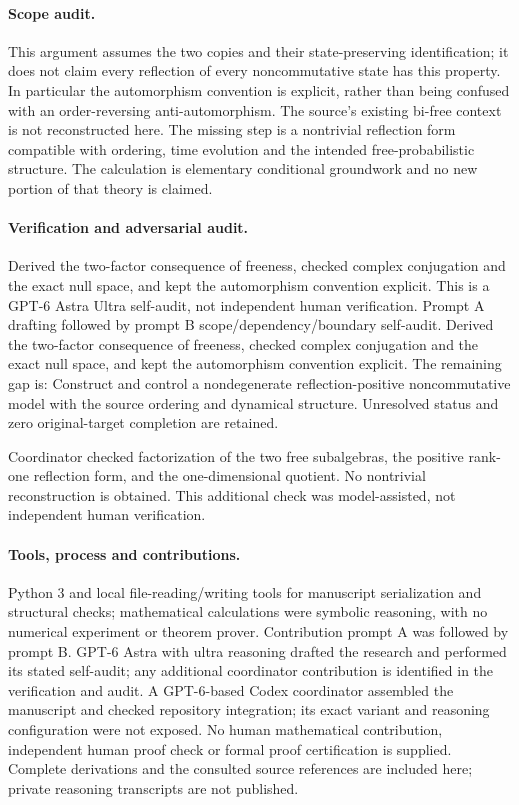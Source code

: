 \documentclass[11pt]{article}
\begin{document}
\paragraph{Scope audit.} This argument assumes the two copies and their state-preserving identification; it does not claim every reflection of every noncommutative state has this property. In particular the automorphism convention is explicit, rather than being confused with an order-reversing anti-automorphism. The source's existing bi-free context is not reconstructed here. The missing step is a nontrivial reflection form compatible with ordering, time evolution and the intended free-probabilistic structure. The calculation is elementary conditional groundwork and no new portion of that theory is claimed.

\paragraph{Verification and adversarial audit.}
Derived the two-factor consequence of freeness, checked complex conjugation and the exact null space, and kept the automorphism convention explicit. This is a GPT-6 Astra Ultra self-audit, not independent human verification. Prompt A drafting followed by prompt B scope/dependency/boundary self-audit. Derived the two-factor consequence of freeness, checked complex conjugation and the exact null space, and kept the automorphism convention explicit. The remaining gap is: Construct and control a nondegenerate reflection-positive noncommutative model with the source ordering and dynamical structure. Unresolved status and zero original-target completion are retained.

Coordinator checked factorization of the two free subalgebras, the positive rank-one reflection form, and the one-dimensional quotient. No nontrivial reconstruction is obtained. This additional check was model-assisted, not independent human verification.

\paragraph{Tools, process and contributions.}
Python 3 and local file-reading/writing tools for manuscript serialization and structural checks; mathematical calculations were symbolic reasoning, with no numerical experiment or theorem prover. Contribution prompt A was followed by prompt B. GPT-6 Astra with ultra reasoning drafted the research and performed its stated self-audit; any additional coordinator contribution is identified in the verification and audit. A GPT-6-based Codex coordinator assembled the manuscript and checked repository integration; its exact variant and reasoning configuration were not exposed. No human mathematical contribution, independent human proof check or formal proof certification is supplied. Complete derivations and the consulted source references are included here; private reasoning transcripts are not published.
\end{document}
